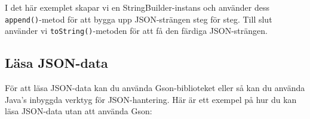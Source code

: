 \hypertarget{cb3}{}
\begin{Shaded}
\begin{Highlighting}[]
\OperatorTok{=}  \OperatorTok{();}
\OperatorTok{(}\OperatorTok{);}
\OperatorTok{(}\StringTok{: }\OperatorTok{);}
\OperatorTok{(}\OperatorTok{);}
\OperatorTok{(}\OperatorTok{);}
\OperatorTok{=}\OperatorTok{();}
\end{Highlighting}
\end{Shaded}

I det här exemplet skapar vi en StringBuilder-instans och använder dess
\texttt{append()}-metod för att bygga upp JSON-strängen steg för steg.
Till slut använder vi \texttt{toString()}-metoden för att få den färdiga
JSON-strängen.

\hypertarget{luxe4sa-json-data}{%
\subsection{Läsa JSON-data}\label{luxe4sa-json-data}}

För att läsa JSON-data kan du använda Gson-biblioteket eller så kan du
använda Java's inbyggda verktyg för JSON-hantering. Här är ett exempel
på hur du kan läsa JSON-data utan att använda Gson:

